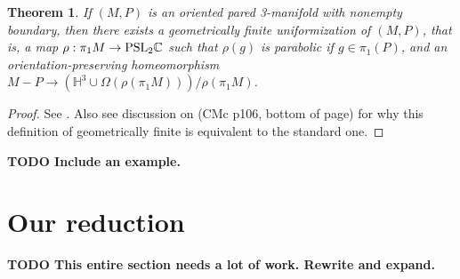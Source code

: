 \documentclass[12pt]{amsart}
\newtheorem{thm}[theorem]{Theorem}
\theoremstyle{definition}
\theoremstyle{remark}
\newcommand{\Om}{\Omega}
\begin{document}

\begin{thm}

If $(M,P)$ is an oriented pared 3-manifold with nonempty boundary, then
there exists a geometrically finite uniformization of $(M,P)$, that is, a map
$\rho: \pi_1M \to \mbox{\rm{PSL}}_2\mathbb{C}$ such that $\rho(g)$ is parabolic
if $g \in \pi_1(P)$, and an orientation-preserving homeomorphism $M-P \to
\left(\mathbb{H}^3 \cup \Om(\rho(\pi_1M))\right)/\rho(\pi_1M)$.

\end{thm}
\begin{proof}

See \cite{CMc}.
Also see discussion on (CMc p106, bottom of page) for why this definition of
geometrically finite is equivalent to the standard one.

\end{proof}


\textbf{ TODO Include an example.}

\section{Our reduction}

\textbf{ TODO This entire section needs a lot of work. Rewrite and expand.}
\end{document}

